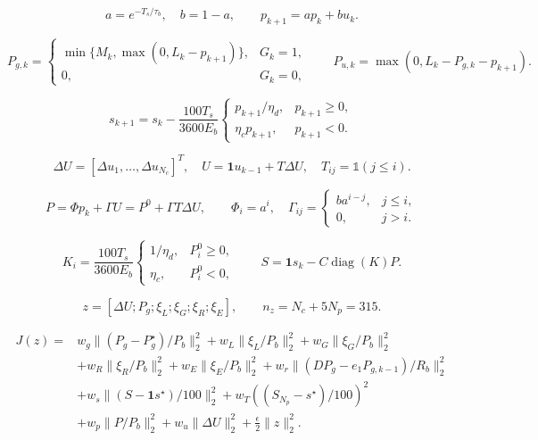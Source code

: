\begin{equation}
a=e^{-T_s/\tau_b},\quad b=1-a,\qquad p_{k+1}=a p_k+b u_k.
\end{equation}

\begin{equation}
P_{g,k}=\begin{cases}\min\{M_k,\max(0,L_k-p_{k+1})\},&G_k=1,\\0,&G_k=0,\end{cases}\qquad
P_{u,k}=\max(0,L_k-P_{g,k}-p_{k+1}).
\end{equation}

\begin{equation}
s_{k+1}=s_k-\frac{100T_s}{3600E_b}\begin{cases}p_{k+1}/\eta_d,&p_{k+1}\ge0,\\\eta_c p_{k+1},&p_{k+1}<0.\end{cases}
\end{equation}

\begin{equation}
\Delta U=[\Delta u_1,\ldots,\Delta u_{N_c}]^T,\quad U=\mathbf1u_{k-1}+T\Delta U,\quad T_{ij}=\mathbb1(j\le i).
\end{equation}

\begin{equation}
P=\Phi p_k+\Gamma U=P^0+\Gamma T\Delta U,\qquad
\Phi_i=a^i,\quad \Gamma_{ij}=\begin{cases}ba^{i-j},&j\le i,\\0,&j>i.\end{cases}
\end{equation}

\begin{equation}
K_i=\frac{100T_s}{3600E_b}\begin{cases}1/\eta_d,&P_i^0\ge0,\\\eta_c,&P_i^0<0,\end{cases}\qquad
S=\mathbf1s_k-C\operatorname{diag}(K)P.
\end{equation}

\begin{equation}
z=[\Delta U;P_g;\xi_L;\xi_G;\xi_R;\xi_E],\qquad n_z=N_c+5N_p=315.
\end{equation}

\begin{equation}
\begin{aligned}
J(z)={}&w_g\|(P_g-P_g^\star)/P_b\|_2^2
+w_L\|\xi_L/P_b\|_2^2+w_G\|\xi_G/P_b\|_2^2\\
&+w_R\|\xi_R/P_b\|_2^2+w_E\|\xi_E/P_b\|_2^2
+w_r\|(DP_g-e_1P_{g,k-1})/R_b\|_2^2\\
&+w_s\|(S-\mathbf1s^\star)/100\|_2^2
+w_T((S_{N_p}-s^\star)/100)^2\\
&+w_p\|P/P_b\|_2^2+w_u\|\Delta U\|_2^2+\frac{\epsilon}{2}\|z\|_2^2.
\end{aligned}
\end{equation}

